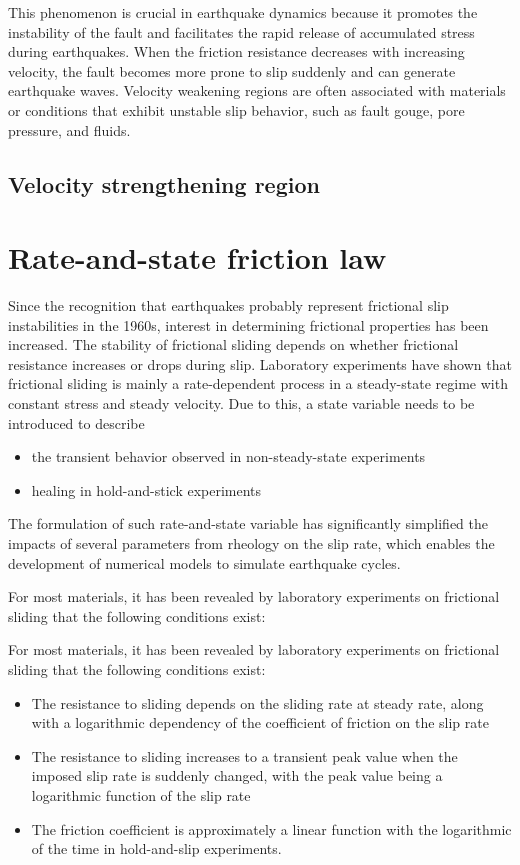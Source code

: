 This phenomenon is crucial in earthquake dynamics because it promotes the instability of the fault and facilitates the rapid release of accumulated stress during earthquakes.
When the friction resistance decreases with increasing velocity, the fault becomes more prone to slip suddenly and can generate earthquake waves.
Velocity weakening regions are often associated with materials or conditions that exhibit unstable slip behavior, such as fault gouge, pore pressure, and fluids.

\subsection{Velocity strengthening region}

\section{Rate-and-state friction law}
Since the recognition that earthquakes probably represent frictional slip instabilities in the 1960s, interest in determining frictional properties has been increased.
The stability of frictional sliding depends on whether frictional resistance increases or drops during slip.
Laboratory experiments have shown that frictional sliding is mainly a rate-dependent process in a steady-state regime with constant stress and steady velocity.
Due to this, a state variable needs to be introduced to describe
\begin{itemize}
    \item the transient behavior observed in non-steady-state experiments
    \item healing in hold-and-stick experiments
\end{itemize}
The formulation of such rate-and-state variable has significantly simplified the impacts of several parameters from rheology on the slip rate, which enables the development of numerical models to simulate earthquake cycles.

For most materials, it has been revealed by laboratory experiments on frictional sliding that the following conditions exist:

For most materials, it has been revealed by laboratory experiments on frictional sliding that the following conditions exist:

\begin{itemize}
    \item The resistance to sliding depends on the sliding rate at steady rate, along with a logarithmic dependency of the coefficient of friction on the slip rate
    \item The resistance to sliding increases to a transient peak value when the imposed slip rate is suddenly changed, with the peak value being a logarithmic function of the slip rate
    \item The friction coefficient is approximately a linear function with the logarithmic of the time in hold-and-slip experiments.
\end{itemize}

